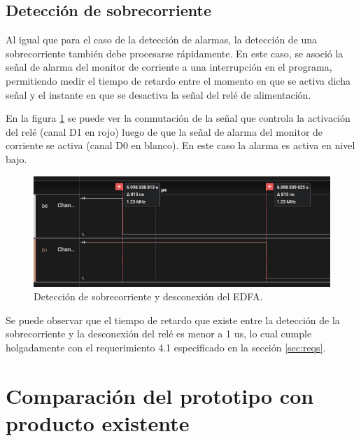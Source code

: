 \subsection{Detección de sobrecorriente}

Al igual que para el caso de la detección de alarmas, la detección de una sobrecorriente también debe procesarse rápidamente. En este caso, se asoció la señal de alarma del monitor de corriente a una interrupción en el programa, permitiendo medir el tiempo de retardo entre el momento en que se activa dicha señal y el instante en que se desactiva la señal del relé de alimentación.

En la figura \ref{fig:detecOC} se puede ver la conmutación de la señal que controla la activación del relé (canal D1 en rojo) luego de que la señal de alarma del monitor de corriente se activa (canal D0 en blanco). En este caso la alarma es activa en nivel bajo.

\begin{figure}[H]
\centering
\includegraphics[width=1\textwidth]{./Figures/detecOC.png}
\caption{Detección de sobrecorriente y desconexión del EDFA.}
\label{fig:detecOC}
\end{figure}

Se puede observar que el tiempo de retardo que existe entre la detección de la sobrecorriente y la desconexión del relé es menor a 1 us, lo cual cumple holgadamente con el requerimiento 4.1 especificado en la sección \ref{sec:reqs}.

\section{Comparación del prototipo con producto existente}

